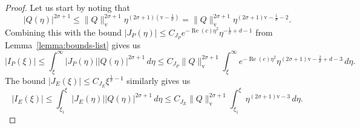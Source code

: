 \documentclass[11pt]{article}
\DeclareMathOperator{\real}{Re}
\newcommand{\normv}{\mathrm{v}}
\begin{document}
\begin{proof}
  Let us start by noting that
  \begin{equation*}
    |Q(\eta)|^{2\sigma + 1}
    \leq \|Q\|_{\normv}^{2\sigma + 1}\eta^{(2\sigma + 1)\left(\normv - \frac{1}{\sigma}\right)}
    = \|Q\|_{\normv}^{2\sigma + 1}\eta^{(2\sigma + 1)\normv - \frac{1}{\sigma} - 2}.
  \end{equation*}
  Combining this with the bound
  \(|J_{P}(\eta)| \leq
  C_{J_{P}}e^{-\real(c)\eta^{2}}\eta^{-\frac{1}{\sigma} + d - 1}\)
  from Lemma~\ref{lemma:bounds-list} gives us
  \begin{equation*}
    |I_{P}(\xi)|
    \leq \int_{\xi}^{\infty} |J_{P}(\eta)||Q(\eta)|^{2\sigma + 1}\,d\eta
    \leq C_{J_{P}}\|Q\|_{\normv}^{2\sigma + 1}
    \int_{\xi}^{\infty} e^{-\real(c)\eta^{2}}\eta^{(2\sigma + 1)\normv - \frac{2}{\sigma} + d - 3}\,d\eta.
  \end{equation*}
  The bound \(|J_{E}(\xi)| \leq C_{J_{E}}\xi^{\frac{1}{\sigma} - 1}\)
  similarly gives us
  \begin{equation*}
    |I_{E}(\xi)|
    \leq \int_{\xi_{1}}^{\xi}|J_{E}(\eta)||Q(\eta)|^{2\sigma + 1}\,d\eta
    \leq C_{J_{E}}\|Q\|_{\normv}^{2\sigma + 1}
    \int_{\xi_{1}}^{\xi} \eta^{(2\sigma + 1)\normv - 3}\,d\eta.
  \end{equation*}


\end{proof}
\end{document}
